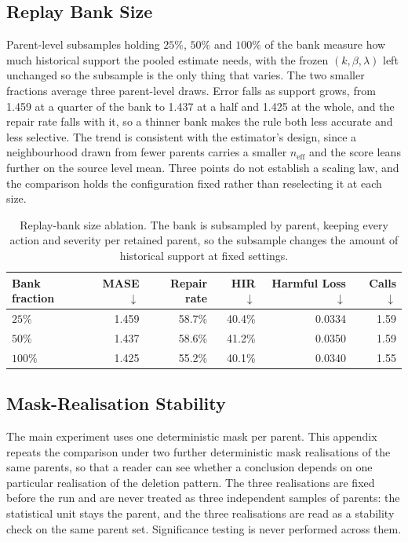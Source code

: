 \documentclass{article}
\begin{document}
\subsection{Replay Bank Size}
\label{app:replaysize}
Parent-level subsamples holding $25\%$, $50\%$ and $100\%$ of the bank measure how much
historical support the pooled estimate needs, with the frozen $(k,\beta,\lambda)$ left
unchanged so the subsample is the only thing that varies. The two smaller fractions average
three parent-level draws. Error falls as support grows, from 1.459 at a quarter of the bank to
1.437 at a half and 1.425 at the whole, and the repair rate falls with it, so a thinner bank
makes the rule both less accurate and less selective. The trend is consistent with the
estimator's design, since a neighbourhood drawn from fewer parents carries a smaller
$n_{\mathrm{eff}}$ and the score leans further on the source level mean. Three points do not
establish a scaling law, and the comparison holds the configuration fixed rather than
reselecting it at each size.

\begin{table}[htbp]
  \caption{Replay-bank size ablation. The bank is subsampled by parent, keeping
  every action and severity per retained parent, so the subsample changes the amount of
  historical support at fixed settings.}
  \label{tab:app-replaysize}
  \centering
  \small
  \setlength{\tabcolsep}{4pt}
  \begin{tabular*}{\textwidth}{@{\extracolsep{\fill}}lrrrrr@{}}
    \toprule
    Bank fraction & MASE $\downarrow$ & Repair rate & HIR $\downarrow$ & Harmful Loss $\downarrow$ & Calls $\downarrow$ \\
    \midrule
    $25\%$  & 1.459 & 58.7\% & 40.4\% & 0.0334 & 1.59 \\
    $50\%$  & 1.437 & 58.6\% & 41.2\% & 0.0350 & 1.59 \\
    $100\%$ & 1.425 & 55.2\% & 40.1\% & 0.0340 & 1.55 \\
    \bottomrule
  \end{tabular*}
\end{table}

\subsection{Mask-Realisation Stability}
\label{app:seeds}
The main experiment uses one deterministic mask per parent. This appendix repeats the
comparison under two further deterministic mask realisations of the same parents, so that a
reader can see whether a conclusion depends on one particular realisation of the deletion
pattern. The three realisations are fixed before the run and are never treated as three
independent samples of parents: the statistical unit stays the parent, and the three
realisations are read as a stability check on the same parent set. Significance testing is
never performed across them.
\end{document}

